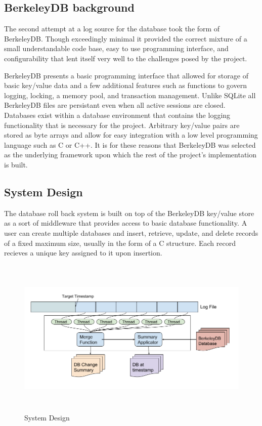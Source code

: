 \documentclass{article}
\begin{document}
\subsection{BerkeleyDB background}
The second attempt at a log source for the database took the form of BerkeleyDB. Though exceedingly minimal it provided the correct mixture of a small understandable code base, easy to use programming interface, and configurability that lent itself very well to the challenges posed by the project.

BerkeleyDB presents a basic programming interface that allowed for storage of basic key/value data and a few additional features such as functions to govern logging, locking, a memory pool, and transaction management. Unlike SQLite all BerkeleyDB files are persistant even when all active sessions are closed. Databases exist within a database environment that contains the logging functionality that is necessary for the project. Arbitrary key/value pairs are stored as byte arrays and allow for easy integration with a low level programming language such as C or C++. It is for these reasons that BerkeleyDB was selected as the underlying framework upon which the rest of the project's implementation is built.

\subsection{System Design}
The database roll back system is built on top of the BerkeleyDB key/value store as a sort of middleware that provides access to basic database functionality. A user can create multiple databases and insert, retrieve, update, and delete records of a fixed maximum size, usually in the form of a C structure. Each record recieves a unique key assigned to it upon insertion. 

\begin{figure}
    \centering
    \includegraphics[height=3in]{rollbackDesgin.png}
    \caption{System Design}
    \label{fig:design1}
\end{figure}
\end{document}
